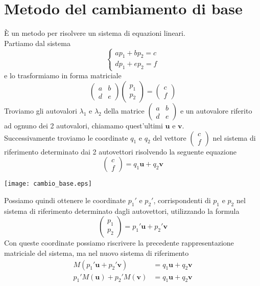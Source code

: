 \documentclass[10pt,a4paper]{article}
\theoremstyle{plain}
\theoremstyle{definition}
\begin{document}
\section{Metodo del cambiamento di base}
 È un metodo per risolvere un sistema di equazioni lineari. \\
Partiamo dal sistema
\[
\begin{cases*}
ap_1 + bp_2 = c \\
dp_1 + ep_2 = f
\end{cases*}
\]
e lo trasformiamo in forma matriciale
\[
\begin{pmatrix}
a & b \\
d & e
\end{pmatrix}
\begin{pmatrix}
p_1 \\
p_2
\end{pmatrix}
= \begin{pmatrix}
c \\
f
\end{pmatrix}
\]
Troviamo gli autovalori $\lambda_1$ e $\lambda_2$ della matrice $\begin{pmatrix}
a & b \\
d & e
\end{pmatrix}$ e un autovalore riferito ad ognuno dei 2 autovalori, chiamamo quest'ultimi $\mathbf{u}$ e $\mathbf{v}$. \\
Successivamente troviamo le coordinate $q_1$ e $q_2$ del vettore $\begin{pmatrix}
c \\
f
\end{pmatrix}$ nel sistema di riferimento determinato dai 2 autovettori risolvendo la seguente equazione
\[
\begin{pmatrix}
c \\
f
\end{pmatrix}=q_1\mathbf{u} + q_2\mathbf{v}
\]
\begin{center}
	\texttt{[image: cambio\_base.eps]}
\end{center}
Possiamo quindi ottenere le coordinate $p_1'$ e $p_2'$, corrispondenti di $p_1$ e $p_2$ nel sistema di riferimento determinato dagli autovettori, utilizzando la formula 
\[
\begin{pmatrix}
p_1 \\
p_2
\end{pmatrix}=p_1'\mathbf{u}+p_2'\mathbf{v}
\]
Con queste coordinate possiamo riscrivere la precedente rappresentazione matriciale del sistema, ma nel nuovo sistema di riferimento
\begin{align*}
M(p_1'\mathbf{u}+p_2'\mathbf{v})&=q_1\mathbf{u}+q_2\mathbf{v}\\
p_1'M(\mathbf{u})+p_2'M(\mathbf{v})&=q_1\mathbf{u}+q_2\mathbf{v}
\end{align*}
\end{document}
